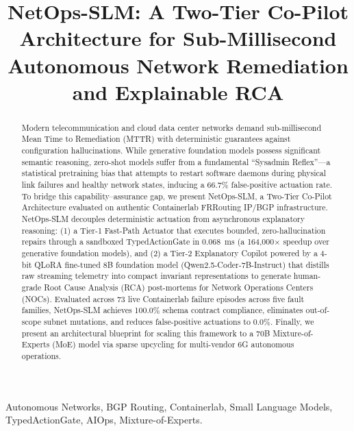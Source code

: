 \documentclass[conference]{IEEEtran}
\begin{document}
\title{NetOps-SLM: A Two-Tier Co-Pilot Architecture for Sub-Millisecond Autonomous Network Remediation and Explainable RCA}

\author{
}

\maketitle

\begin{abstract}
Modern telecommunication and cloud data center networks demand sub-millisecond Mean Time to Remediation (MTTR) with deterministic guarantees against configuration hallucinations. While generative foundation models possess significant semantic reasoning, zero-shot models suffer from a fundamental ``Sysadmin Reflex''---a statistical pretraining bias that attempts to restart software daemons during physical link failures and healthy network states, inducing a 66.7\% false-positive actuation rate. To bridge this capability--assurance gap, we present NetOps-SLM, a Two-Tier Co-Pilot Architecture evaluated on authentic Containerlab FRRouting IP/BGP infrastructure. NetOps-SLM decouples deterministic actuation from asynchronous explanatory reasoning: (1) a Tier-1 Fast-Path Actuator that executes bounded, zero-hallucination repairs through a sandboxed TypedActionGate in 0.068~ms (a 164,000$\times$ speedup over generative foundation models), and (2) a Tier-2 Explanatory Copilot powered by a 4-bit QLoRA fine-tuned 8B foundation model (Qwen2.5-Coder-7B-Instruct) that distills raw streaming telemetry into compact invariant representations to generate human-grade Root Cause Analysis (RCA) post-mortems for Network Operations Centers (NOCs). Evaluated across 73 live Containerlab failure episodes across five fault families, NetOps-SLM achieves 100.0\% schema contract compliance, eliminates out-of-scope subnet mutations, and reduces false-positive actuations to 0.0\%. Finally, we present an architectural blueprint for scaling this framework to a 70B Mixture-of-Experts (MoE) model via sparse upcycling for multi-vendor 6G autonomous operations.
\end{abstract}

\begin{IEEEkeywords}
Autonomous Networks, BGP Routing, Containerlab, Small Language Models, TypedActionGate, AIOps, Mixture-of-Experts.
\end{IEEEkeywords}
\end{document}
